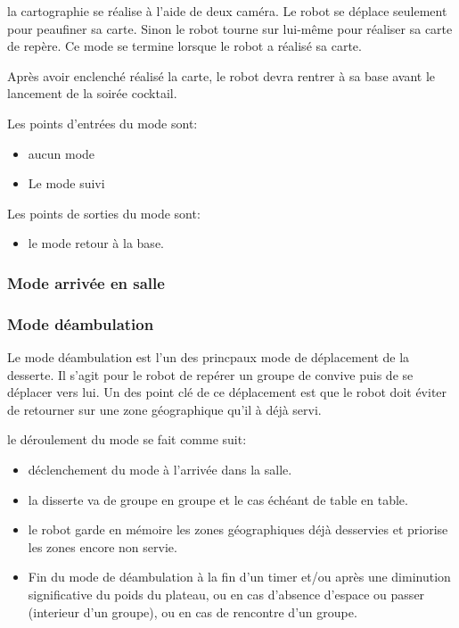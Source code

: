 la cartographie se réalise à l'aide de deux caméra. Le robot se déplace seulement pour peaufiner sa carte. Sinon le robot tourne sur lui-même pour réaliser sa carte de repère. Ce mode se termine lorsque le robot a réalisé sa carte. 

Après avoir enclenché réalisé la carte, le robot devra rentrer à sa base avant le lancement de la soirée cocktail.

Les points d'entrées du mode sont:
\begin{itemize}
\item aucun mode
\item Le mode suivi
\end{itemize}

Les points de sorties du mode sont:
\begin{itemize}
\item le mode retour à la base.
\end{itemize}

\subsubsection{Mode arrivée en salle}

\subsubsection{Mode déambulation}

Le mode déambulation est l'un des princpaux mode de déplacement de la
desserte. Il s'agit pour le robot de repérer un groupe de convive puis
de se déplacer vers lui. Un des point clé de ce déplacement est que le
robot doit éviter de retourner sur une zone géographique qu'il à déjà
servi.

le déroulement du mode se fait comme suit:
\begin{itemize}
\item déclenchement du mode à l'arrivée dans la salle.
\item la disserte va de groupe en groupe et le cas échéant de table en
  table.
\item le robot garde en mémoire les zones géographiques déjà
  desservies et priorise les zones encore non servie.
\item Fin du mode de déambulation à la fin d'un timer et/ou après une
  diminution significative du poids du plateau, ou en cas d'absence
  d'espace ou passer (interieur d'un groupe), ou en cas de rencontre
  d'un groupe.\\
\end{itemize}

